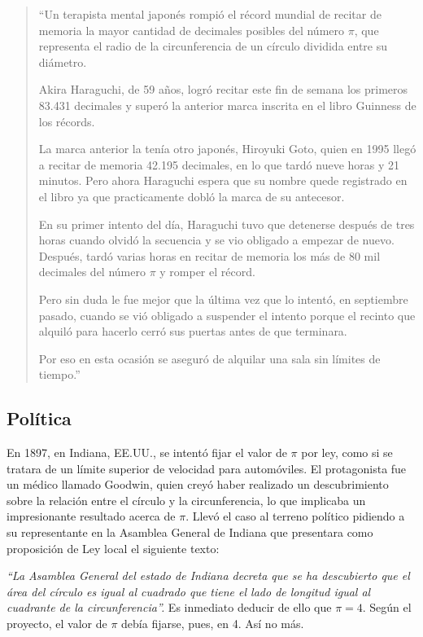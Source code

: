 \begin{quote}
``Un terapista mental japonés rompió el récord mundial de recitar de memoria la mayor cantidad de decimales 
posibles del número $\pi$, que representa el radio de la circunferencia de un círculo dividida entre su diámetro.

Akira Haraguchi, de 59 años, logró recitar este fin de semana los primeros 83.431 decimales y superó la anterior 
marca inscrita en el libro Guinness de los récords.

La marca anterior la tenía otro japonés, Hiroyuki Goto, quien en 1995 llegó a recitar de memoria 42.195 decimales, 
en lo que tardó nueve horas y 21 minutos. Pero ahora Haraguchi espera que su nombre quede registrado en el libro 
ya que practicamente dobló la marca de su antecesor.

En su primer intento del día, Haraguchi tuvo que detenerse después de tres horas cuando olvidó la secuencia y 
se vio obligado a empezar de nuevo. Después, tardó varias horas en recitar de memoria los más de 80 mil decimales 
del número $\pi$ y romper el récord. 

Pero sin duda le fue mejor que la última vez que lo intentó, en septiembre pasado, cuando se vió obligado a 
suspender el intento porque el recinto que alquiló para hacerlo cerró sus puertas antes de que terminara.

Por eso en esta ocasión se aseguró de alquilar una sala sin límites de tiempo.''
\end{quote}

\subsection*{Política}
En 1897, en Indiana, EE.UU., se intentó fijar el valor de $\pi$ por ley, como si se tratara de un límite superior de velocidad para automóviles. 
El protagonista fue un médico llamado Goodwin, quien creyó haber realizado un descubrimiento sobre la relación entre el círculo y la circunferencia, 
lo que implicaba un impresionante resultado acerca de $\pi$. Llevó el caso al terreno político pidiendo a su representante en la Asamblea General de Indiana 
que presentara como proposición de Ley local el siguiente texto: 

\textit{``La Asamblea General del estado de Indiana decreta que se ha descubierto que el área del círculo es igual al cuadrado 
que tiene el lado de longitud igual al cuadrante de la circunferencia''.} Es inmediato deducir de ello que $\pi = 4$. 
Según el proyecto, el valor de $\pi$ debía fijarse, pues, en 4. Así no más.

